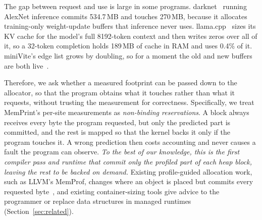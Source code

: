 \documentclass[11pt]{article}
\newcommand{\memprint}{MemPrint}
\newcommand{\secref}[1]{Section~\ref{#1}}
\newcommand{\term}[1]{\emph{#1}}
\begin{document}
The gap between request and use is large in some programs. darknet~\cite{darknet} running AlexNet inference
commits 534.7\,MB and touches 270\,MB, because it allocates training-only weight-update buffers that inference
never uses. llama.cpp~\cite{llamacpp} sizes its KV cache for the model's full 8192-token context and then writes
zeros over all of it, so a 32-token completion holds 189\,MB of cache in RAM and uses 0.4\% of it. miniVite's
edge list grows by doubling, so for a moment the old and new buffers are both live~\cite{minivite}.

Therefore, we ask whether a measured footprint can be passed down to the allocator, so that the program
obtains what it touches rather than what it requests, without trusting the measurement for correctness.
Specifically, we treat \memprint{}'s per-site measurements as \term{non-binding reservations}. A block always
receives every byte the program requested, but only the predicted part is committed, and the rest is mapped so
that the kernel backs it only if the program touches it. A wrong prediction then costs accounting and never
causes a fault the program can observe.
\emph{To the best of our knowledge, this is the first compiler pass and runtime that commit only the profiled
part of each heap block, leaving the rest to be backed on demand.} Existing profile-guided allocation work, such
as LLVM's MemProf, changes where an object is placed but commits every requested byte~\cite{MemProf}, and existing
container-sizing tools give advice to the programmer or replace data structures in managed
runtimes~\cite{LibstdcxxProfile,Makor2025Replacement} (\secref{sec:related}).
\end{document}
